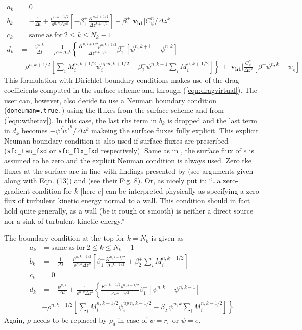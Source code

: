 \documentclass[dvipdfmx,a4paper,10pt]{article}
\begin{document}
\begin{align*}
  a_k &= 0 \\
    b_k &= -\frac{1}{\Delta t} +\frac{\rho^{n,k+1/2}}{\rho^{n,k}\Delta z^k} \left[- \beta_1^+\frac{K^{n,k+1/2}}{\Delta z^{k+1/2}} \right]-\beta_1^+|\mathbf{v_{h1}}|C^n_{\psi}/\Delta z^k  \\
      c_k &= \mathrm{same~as~for~}2\leq k \leq N_k-1 \\
      d_k &=  -\frac{\psi^{n,k}}{\Delta t} - \frac{1}{\rho^{n,k}\Delta z^k} \left\{ \frac{K^{n,k+1/2}\rho^{n,k+1/2}}{\Delta z^{k+1/2}}\beta_1^{-}\left[\psi^{n,k+1} - \psi^{n,k}\right]\right.   \\   
          & \left. -\rho^{n,k+1/2}\left[\sum_iM_i^{n,k+1/2}\psi_i^{up~n,k+1/2} -\beta_2^{-}\psi^{n,k+1}\sum_iM_i^{n,k+1/2} \right] \right\} +|\mathbf{v_{h1}}|\frac{C^n_{\psi}}{\Delta z^k}\left[\beta^-\psi^{n,k} - \psi_s\right]    
\end{align*}
This formulation with Dirichlet boundary conditions makes use of the drag coefficients computed in the surface scheme and through (\ref{eqn:dragvirtual}). The user can, however, also decide to use a Neuman boundary condition ({\tt doneuman=.true.}) using the fluxes from the surface scheme and from (\ref{eqn:wthetav}). In this case, the last rhs term in $b_k$ is dropped and the last term in $d_k$ becomes $- \overline{\psi'w'}^n/\Delta z^k$ makeing the surface fluxes fully explicit. This explicit Neuman boundary condition is also used if surface fluxes are prescribed ({\tt sfc\_tau\_fxd} or {\tt sfc\_flx\_fxd} respectively). Same as in \cite{deardorff74}, the surface flux of $e$ is assumed to be zero and the explicit Neuman condition is always used. Zero tke fluxes at the surface are in line with findings presented by \cite{mcbean75} (see arguments given along with Eqn. (13)) and \cite{lenschow74} (see their Fig. 8). Or, as \cite{fuhrmann10} nicely put it:  ``\dots a zero-gradient condition for $k$ [here $e$] can be interpreted physically as specifying a zero flux of turbulent kinetic energy normal to a wall. This condition should in fact hold quite generally, as a wall (be it rough or smooth) is neither a direct source nor a sink of turbulent kinetic energy.''

The boundary condition at the top for $k=N_k$ is given as
\begin{align*}
  a_k &= \mathrm{same~as~for~}2\leq k \leq N_k-1  \\
    b_k &= -\frac{1}{\Delta t} - \frac{\rho^{n,k-1/2}}{\rho^{n,k}\Delta z^k} \left[\beta_1^+\frac{K^{n,k-1/2}}{\Delta z ^{k-1/2}}+\beta_2^+\sum_iM_i^{n,k-1/2} \right] \\
      c_k &= 0 \\
      d_k &= -\frac{\psi^{n,k}}{\Delta t} + \frac{1}{\rho^{n,k}\Delta z^k} \left\{ \frac{K^{n,k-1/2}\rho^{n,k-1/2}}{\Delta z^{k-1/2}}\beta_1^{-}\left[\psi^{n,k} - \psi^{n,k-1}\right]\right.   \\   
          & \left.-\rho^{n,k-1/2}\left[\sum_iM_i^{n,k-1/2}\psi_i^{up~n,k-1/2} -\beta_2^{-}\psi^{n,k}\sum_iM_i^{n,k-1/2} \right]\right\}.    
\end{align*}
Again, $\rho$ needs to be replaced by $\rho_d$ in case of $\psi=r_v$ or $\psi=e$. 
\end{document}
